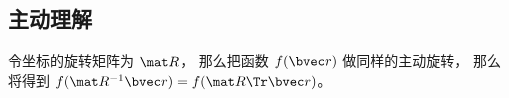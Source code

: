 
\subsection{主动理解}
令坐标的旋转矩阵为 $\mat R$， 那么把函数 $f(\bvec r)$ 做同样的主动旋转， 那么将得到 $f(\mat R^{-1}\bvec r) = f(\mat R\Tr \bvec r)$。
